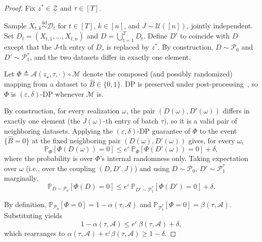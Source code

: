 \documentclass{article}
\theoremstyle{plain}
\theoremstyle{definition}
\theoremstyle{remark}
\newcommand{\cZ}{\ensuremath{\mathcal{Z}}}
\newcommand{\cM}{\ensuremath{\mathcal{M}}}
\newcommand{\cP}{\ensuremath{\mathcal{P}}}
\newcommand{\cA}{\ensuremath{\mathcal{A}}}
\newcommand{\cD}{\ensuremath{\mathcal{D}}}
\renewcommand{\leq}{\leqslant}
\renewcommand{\geq}{\geqslant}
\newcommand{\cU}{\mathcal{U}}
\newcommand{\bP}{\mathbb{P}}
\begin{document}
\begin{proof}
    Fix $z^* \in \cZ$ and $\tau \in [T]$. %

    Sample $X_{t,k} \stackrel{\text{iid}}{\sim} \cD_t$ for $t \in [T]$, $k \in [n]$, and $J \sim \cU([n])$, jointly independent. Set $D_t = (X_{t,1}, \dots, X_{t,n})$ and $D = \bigcup_{t=1}^{T} D_t$. Define $D'$ to coincide with $D$ except that the $J$-th entry of $D_\tau$ is replaced by $z^*$. By construction, $D \sim \cP_0$ and $D' \sim \cP_1^{\tau}$, and the two datasets differ in exactly one element.

    Let $\Phi \triangleq \cA(z_\star,\tau,\cdot) \circ \cM$ denote the composed (and possibly randomized) mapping from a dataset to $\widehat{B} \in \{0,1\}$. DP is preserved under post-processing~\citep{dpbook}, so $\Phi$ is $(\varepsilon, \delta)$-DP whenever $\cM$ is.

    By construction, for every realization $\omega$, the pair $(D(\omega), D'(\omega))$ differs in exactly one element (the $J(\omega)$-th entry of batch $\tau$), so it is a valid pair of neighboring datasets. Applying the $(\varepsilon,\delta)$-DP guarantee of $\Phi$ to the event $\{\widehat{B} = 0\}$ at the fixed neighboring pair $(D(\omega), D'(\omega))$ gives, for every $\omega$,
    \begin{equation*}
        \bP_{\Phi}\!\left[\Phi(D(\omega)) = 0\right] \leq e^{\varepsilon}\, \bP_{\Phi}\!\left[\Phi(D'(\omega)) = 0\right] + \delta,
    \end{equation*}
    where the probability is over $\Phi$'s internal randomness only. Taking expectation over $\omega$ (i.e., over the coupling $(D, D', J)$) and using $D \sim \cP_0$, $D' \sim \cP_1^{\tau}$ marginally,
    \begin{equation*}
        \bP_{D \sim \cP_0}\!\left[\Phi(D) = 0\right] \leq e^{\varepsilon}\, \bP_{D' \sim \cP_1^{\tau}}\!\left[\Phi(D') = 0\right] + \delta.
    \end{equation*}

    By definition, $\bP_{\cP_0}[\Phi = 0] = 1 - \alpha(\tau,\cA)$ and $\bP_{\cP_1^{\tau}}[\Phi = 0] = \beta(\tau,\cA)$. Substituting yields
    \begin{equation*}
        1 - \alpha(\tau,\cA) \leq e^{\varepsilon}\, \beta(\tau,\cA) + \delta,
    \end{equation*}
    which rearranges to $\alpha(\tau,\cA) + e^{\varepsilon} \beta(\tau,\cA) \geq 1 - \delta$.


\end{proof}
\end{document}
